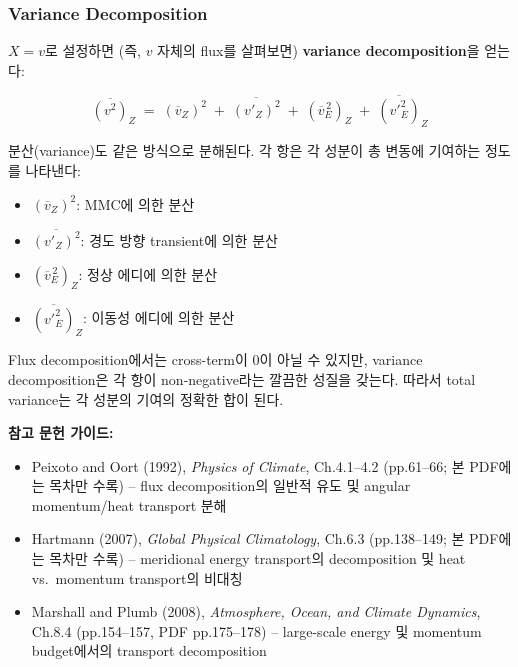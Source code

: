 \subsubsection{Variance Decomposition}

$X = v$로 설정하면 (즉, $v$ 자체의 flux를 살펴보면) \textbf{variance decomposition}을 얻는다:

\begin{proposition}\label{prop:var-decomp}

  \begin{equation}\label{eq:var-decomp}
    \overline{(v^2)}_Z
    \;=\; (\overline{v}_Z)^2
    \;+\; \overline{(v'_Z)^2}
    \;+\; (\overline{v}_E^{\,2})_Z
    \;+\; \overline{(v'^2_E)}_Z
  \end{equation}
\end{proposition}

\begin{hisublock}
  분산(variance)도 같은 방식으로 분해된다.
  각 항은 각 성분이 총 변동에 기여하는 정도를 나타낸다:
  \begin{itemize}
    \item $(\overline{v}_Z)^2$: MMC에 의한 분산
    \item $\overline{(v'_Z)^2}$: 경도 방향 transient에 의한 분산
    \item $(\overline{v}_E^{\,2})_Z$: 정상 에디에 의한 분산
    \item $\overline{(v'^2_E)}_Z$: 이동성 에디에 의한 분산
  \end{itemize}
\end{hisublock}

\begin{remark}

  Flux decomposition에서는 cross-term이 0이 아닐 수 있지만,
  variance decomposition은 각 항이 non-negative라는 깔끔한 성질을 갖는다.
  따라서 total variance는 각 성분의 기여의 정확한 합이 된다.
\end{remark}

\begin{hisublock}
\textbf{참고 문헌 가이드:}
\begin{itemize}
  \item Peixoto and Oort (1992), \textit{Physics of Climate}, Ch.4.1--4.2 (pp.61--66; 본 PDF에는 목차만 수록) -- flux decomposition의 일반적 유도 및 angular momentum/heat transport 분해
  \item Hartmann (2007), \textit{Global Physical Climatology}, Ch.6.3 (pp.138--149; 본 PDF에는 목차만 수록) -- meridional energy transport의 decomposition 및 heat vs.\ momentum transport의 비대칭
  \item Marshall and Plumb (2008), \textit{Atmosphere, Ocean, and Climate Dynamics}, Ch.8.4 (pp.154--157, PDF pp.175--178) -- large-scale energy 및 momentum budget에서의 transport decomposition
\end{itemize}
\end{hisublock}
